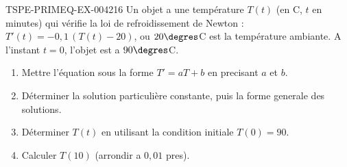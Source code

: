 \begin{exercice}{TSPE-PRIMEQ-EX-004}{2}{16}
Un objet a une température $T(t)$ (en \degres C, $t$ en minutes) qui vérifie la loi de refroidissement de Newton : $T'(t) = -0{,}1\,(T(t) - 20)$, ou $20\degres$C est la température ambiante. A l'instant $t=0$, l'objet est a $90\degres$C.
\begin{enumerate}
  \item Mettre l'équation sous la forme $T' = aT + b$ en precisant $a$ et $b$.
  \item Déterminer la solution particulière constante, puis la forme generale des solutions.
  \item Déterminer $T(t)$ en utilisant la condition initiale $T(0)=90$.
  \item Calculer $T(10)$ (arrondir a $0{,}01$ pres).
\end{enumerate}
\end{exercice}
